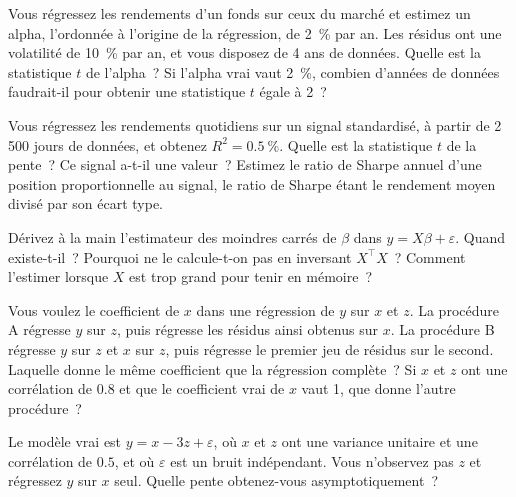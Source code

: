 \begin{question}\label{iq:iv1:regression:5}
Vous régressez les rendements d'un fonds sur ceux du marché et estimez un alpha, l'ordonnée à l'origine de la régression, de 2~\% par an. Les résidus ont une volatilité de 10~\% par an, et vous disposez de 4 ans de données. Quelle est la statistique $t$ de l'alpha~? Si l'alpha vrai vaut 2~\%, combien d'années de données faudrait-il pour obtenir une statistique $t$ égale à 2~?
\end{question}

\begin{question}\label{iq:iv1:regression:6}
Vous régressez les rendements quotidiens sur un signal standardisé, à partir de 2\,500 jours de données, et obtenez $R^2 = 0.5~\%$. Quelle est la statistique $t$ de la pente~? Ce signal a-t-il une valeur~? Estimez le ratio de Sharpe annuel d'une position proportionnelle au signal, le ratio de Sharpe étant le rendement moyen divisé par son écart type.
\end{question}

\begin{question}\label{iq:iv1:regression:7}
Dérivez à la main l'estimateur des moindres carrés de $\beta$ dans $y = X\beta + \varepsilon$. Quand existe-t-il~? Pourquoi ne le calcule-t-on pas en inversant $X^\top X$~? Comment l'estimer lorsque $X$ est trop grand pour tenir en mémoire~?
\end{question}

\begin{question}\label{iq:iv1:regression:8}
Vous voulez le coefficient de $x$ dans une régression de $y$ sur $x$ et $z$. La procédure A régresse $y$ sur $z$, puis régresse les résidus ainsi obtenus sur $x$. La procédure B régresse $y$ sur $z$ et $x$ sur $z$, puis régresse le premier jeu de résidus sur le second. Laquelle donne le même coefficient que la régression complète~? Si $x$ et $z$ ont une corrélation de $0.8$ et que le coefficient vrai de $x$ vaut 1, que donne l'autre procédure~?
\end{question}

\begin{question}\label{iq:iv1:regression:9}
Le modèle vrai est $y = x - 3z + \varepsilon$, où $x$ et $z$ ont une variance unitaire et une corrélation de $0.5$, et où $\varepsilon$ est un bruit indépendant. Vous n'observez pas $z$ et régressez $y$ sur $x$ seul. Quelle pente obtenez-vous asymptotiquement~?
\end{question}

